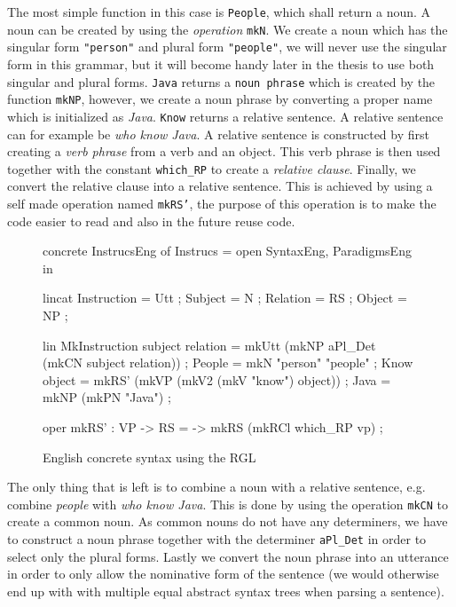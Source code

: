 The most simple function in this case is \texttt{People}, which shall return a noun. A noun can be created by using the \emph{operation} \texttt{mkN}. We create a noun which has the singular form \texttt{"person"} and plural form \texttt{"people"}, we will never use the singular form in this grammar, but it will become handy later in the thesis to use both singular and plural forms.
\newline
\newline
\texttt{Java} returns a \texttt{noun phrase} which is created by the function \texttt{mkNP}, however, we create a noun phrase by converting a proper name which is initialized as \emph{Java}. \texttt{Know} returns a relative sentence. A relative sentence can for example be \emph{who know Java}. A relative sentence is constructed by first creating a \emph{verb phrase} from a verb and an object. This verb phrase is then used together with the constant \texttt{which\_RP} to create a \emph{relative clause}. Finally, we convert the relative clause into a relative sentence. This is achieved by using a self made operation named \texttt{mkRS'}, the purpose of this operation is to make the code easier to read and also in the future reuse code. 

\begin{figure}[H]
\begin{code}
concrete InstrucsEng of Instrucs = open SyntaxEng, ParadigmsEng in {
  lincat
    Instruction = Utt ;
    Subject = N ;
    Relation = RS ;
    Object = NP ;

  lin
    MkInstruction subject relation = mkUtt 
                                      (mkNP aPl_Det (mkCN subject relation)) ;
    People = mkN "person" "people" ;
    Know object = mkRS' (mkVP (mkV2 (mkV "know") object)) ;
    Java = mkNP (mkPN "Java") ;
    
   oper
      mkRS' : VP -> RS = \vp -> mkRS (mkRCl which_RP vp) ;
}
\end{code}
\caption{English concrete syntax using the RGL\label{fig:english-RGL}}
\end{figure}

The only thing that is left is to combine a noun with a relative sentence, e.g. combine \emph{people} with \emph{who know Java}. This is done by using the operation \texttt{mkCN} to create a common noun. As common nouns do not have any determiners, we have to construct a noun phrase together with the determiner \texttt{aPl\_Det} in order to select only the plural forms. Lastly we convert the noun phrase into an utterance in order to only allow the nominative form of the sentence (we would otherwise end up with with multiple equal abstract syntax trees when parsing a sentence).


